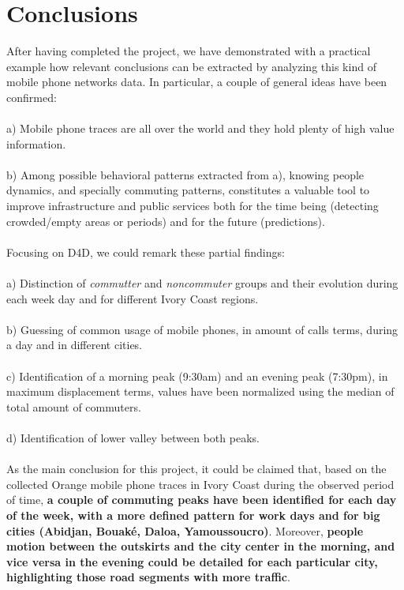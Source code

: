 \newpage
\section{Conclusions}

After having completed the project, we have demonstrated with a practical example how relevant conclusions can be extracted by analyzing this kind of mobile phone networks data. In particular, a couple of general ideas have been confirmed:
\\
\\
a) Mobile phone traces are all over the world and they hold plenty of high value information.
\\
\\
b) Among possible behavioral patterns extracted from a), knowing people dynamics, and specially commuting patterns, constitutes a valuable tool to improve infrastructure and public services both for the time being (detecting crowded/empty areas or periods) and for the future (predictions).
\\
\\
Focusing on D4D, we could remark these partial findings:
\\
\\
a) Distinction of {\it commutter} and {\it noncommuter} groups and their evolution during each week day and for different Ivory Coast regions.
\\
\\
b) Guessing of common usage of mobile phones, in amount of calls terms, during a day and in different cities.
\\
\\
c) Identification of a morning peak (9:30am) and an evening peak (7:30pm), in maximum displacement terms, values have been normalized using the median of total amount of commuters.
\\
\\
d) Identification of lower valley between both peaks.
\\
\\
As the main conclusion for this project, it could be claimed that, based on the collected Orange mobile phone traces in Ivory Coast during the observed period of time, {\bf a couple of commuting peaks have been identified for each day of the week, with a more defined pattern for work days and for big cities (Abidjan, Bouaké, Daloa, Yamoussoucro)}. Moreover, {\bf people motion between the outskirts and the city center in the morning, and vice versa in the evening could be detailed for each particular city, highlighting those road segments with more traffic}.
